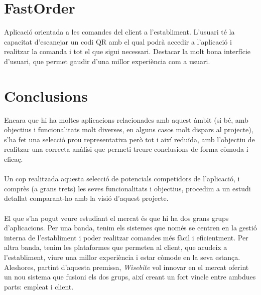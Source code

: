 \section{FastOrder}

Aplicació\cite{fastorder} orientada a les comandes del client a l'establiment. L'usuari té la capacitat d'escanejar un codi QR amb el qual podrà accedir a l'aplicació i realitzar la comanda i tot el que sigui necessari. Destacar la molt bona interfície d'usuari, que permet gaudir d'una millor experiència com a usuari.


\section{Conclusions}

Encara que hi ha moltes aplicacions relacionades amb aquest àmbit (si bé, amb objectius i funcionalitats molt diverses, en alguns casos molt dispars al projecte), s'ha fet una selecció prou representativa però tot i així reduïda, amb l'objectiu de realitzar una correcta anàlisi que permeti treure conclusions de forma còmoda i eficaç.
\\\\
Un cop realitzada aquesta selecció de potencials competidors de l'aplicació, i comprès (a grans trets) les seves funcionalitats i objectius, procedim a un estudi detallat comparant-ho amb la visió d'aquest projecte.
\\\\
El que s'ha pogut veure estudiant el mercat és que hi ha dos grans grups d'aplicacions. Per una banda, tenim els sistemes que només se centren en la gestió interna de l'establiment i poder realitzar comandes més fàcil i eficientment. Per altra banda, tenim les plataformes que permeten al client, que acudeix a l'establiment, viure una millor experiència i estar còmode en la seva estança. Aleshores, partint d'aquesta premissa, \textit{Wisebite} vol innovar en el mercat oferint un nou sistema que fusioni els dos grups, així creant un fort vincle entre ambdues parts: empleat i client.